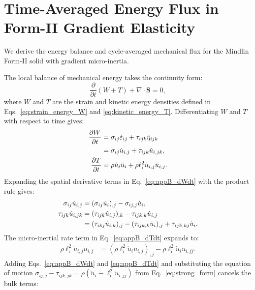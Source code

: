 \section{Time-Averaged Energy Flux in Form-II Gradient Elasticity}
\label{app:energy_flux}

We derive the energy balance and cycle-averaged mechanical flux for the Mindlin Form-II solid with gradient micro-inertia.

The local balance of mechanical energy takes the continuity form:
\begin{equation}
\frac{\partial}{\partial t}(W + T) + \nabla \cdot \bm{S} = 0,
\label{eq:appB_poynting_theorem}
\end{equation}
where $W$ and $T$ are the strain and kinetic energy densities defined in Eqs.~\eqref{eq:strain_energy_W} and \eqref{eq:kinetic_energy_T}. Differentiating $W$ and $T$ with respect to time gives:
\begin{align}
\frac{\partial W}{\partial t} &= \sigma_{ij} \dot{\varepsilon}_{ij} + \tau_{ijk} \dot{\eta}_{ijk} \notag \\
&= \sigma_{ij} \dot{u}_{i,j} + \tau_{ijk} \dot{u}_{i,jk}, \label{eq:appB_dWdt} \\
\frac{\partial T}{\partial t} &= \rho \dot{u}_i \ddot{u}_i + \rho \ell_{\mathrm{i}}^2 \dot{u}_{i,j} \ddot{u}_{i,j}. \label{eq:appB_dTdt}
\end{align}
Expanding the spatial derivative terms in Eq.~\eqref{eq:appB_dWdt} with the product rule gives:
\begin{align}
\sigma_{ij} \dot{u}_{i,j} &= (\sigma_{ij} \dot{u}_i)_{,j} - \sigma_{ij,j} \dot{u}_i, \label{eq:appB_id1} \\
\tau_{ijk} \dot{u}_{i,jk} &= (\tau_{ijk} \dot{u}_{i,j})_{,k} - \tau_{ijk,k} \dot{u}_{i,j} \notag \\
&= (\tau_{ikj} \dot{u}_{i,k})_{,j} - (\tau_{ijk,k} \dot{u}_i)_{,j} + \tau_{ijk,kj} \dot{u}_i. \label{eq:appB_id2}
\end{align}
The micro-inertial rate term in Eq.~\eqref{eq:appB_dTdt} expands to:
\begin{equation}
\begin{split}
\rho \ell_{\mathrm{i}}^2 \dot{u}_{i,j} \ddot{u}_{i,j}
&= (\rho \ell_{\mathrm{i}}^2 \dot{u}_i \ddot{u}_{i,j})_{,j} - \rho \ell_{\mathrm{i}}^2 \dot{u}_i \ddot{u}_{i,jj}.
\end{split}
\label{eq:appB_id3}
\end{equation}
Adding Eqs.~\eqref{eq:appB_dWdt} and \eqref{eq:appB_dTdt} and substituting the equation of motion $\sigma_{ij,j} - \tau_{ijk,jk} = \rho(\ddot{u}_i - \ell_{\mathrm{i}}^2 \ddot{u}_{i,jj})$ from Eq.~\eqref{eq:strong_form} cancels the bulk terms:

